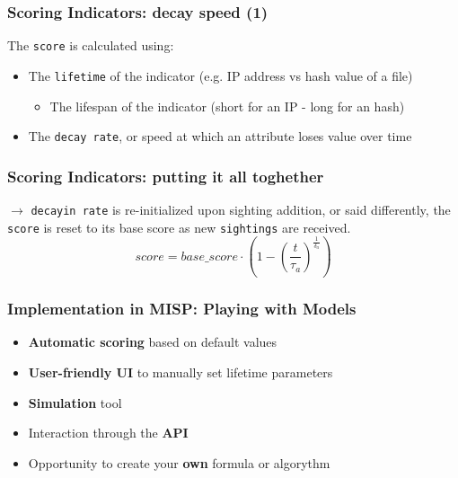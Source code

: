 \begin{frame}
    \frametitle{Scoring Indicators: decay speed (1)}
    The \texttt{score} is calculated using:
   \begin{itemize}
       \item The \texttt{lifetime} of the indicator (e.g. IP address vs hash value of a file)
       \begin{itemize}
           \item The lifespan of the indicator (short for an IP - long for an hash)
       \end{itemize}
       \item The \texttt{decay rate}, or speed at which an attribute loses value over time
   \end{itemize}
\end{frame}

\begin{frame}
    \frametitle{Scoring Indicators: putting it all toghether}
    $\rightarrow$ \texttt{decayin rate} is re-initialized upon sighting addition, or said differently, the \texttt{score} is reset to its base score as new \texttt{sightings} are received.
    $$score = base\_score \cdot \left( 1 - \left( \frac{t}{\tau_a} \right)^{\frac{1}{\delta_a}} \right) $$
\end{frame}

\begin{frame}
\frametitle{Implementation in MISP: Playing with Models}
    \begin{itemize}
        \item \textbf{Automatic scoring} based on default values
        \item \textbf{User-friendly UI} to manually set lifetime parameters
        \item \textbf{Simulation} tool
        \item Interaction through the \textbf{API}
        \item Opportunity to create your \textbf{own} formula or algorythm
    \end{itemize}
\end{frame}

